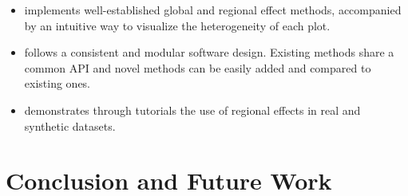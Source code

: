 \documentclass[
twocolumn,
]{ceurart}
\begin{document}
\begin{itemize}
\item implements well-established global and regional effect methods, accompanied by an intuitive way to visualize the heterogeneity of each plot. 
\item follows a consistent and modular software design. Existing methods share a common API and novel methods can be easily added and compared to existing ones.
\item demonstrates through tutorials the use of regional effects in real and synthetic datasets.
\end{itemize}



\section{Conclusion and Future Work}


\end{document}
